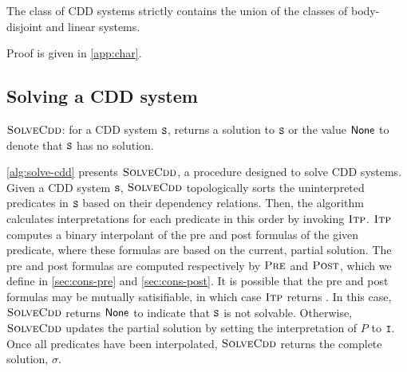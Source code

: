 \begin{thm}
\label{thm:cdd-contains}
  The class of CDD systems strictly contains the union of the classes
  of body-disjoint and linear systems.
\end{thm}
%
Proof is given in \autoref{app:char}.

\subsection{Solving a CDD system}
\label{sec:solve-cdd}

\begin{algorithm}[t]
  \caption{$\textsc{SolveCdd}$: for a CDD system $\cc{S}$, returns a
    solution to $\cc{S}$ or the value $\mathsf{None}$ to denote that
    $\cc{S}$ has no solution.}
  \label{alg:solve-cdd}
\end{algorithm}


\autoref{alg:solve-cdd} presents $\textsc{SolveCdd}$, a procedure designed to solve
CDD systems.
%
Given a CDD system $\cc{S}$, $\textsc{SolveCdd}$ topologically sorts the uninterpreted
predicates in $\cc{S}$ based on their dependency relations.
%
Then, the algorithm calculates interpretations for each predicate in this order
by invoking $\textsc{Itp}$.
%
$\textsc{Itp}$ computes a binary interpolant of the pre and post formulas of the
given predicate, where these formulas are based on the current, partial
solution.
%
The pre and post formulas are computed respectively by $\textsc{Pre}$ and
$\textsc{Post}$, which we define in \autoref{sec:cons-pre} and \autoref{sec:cons-post}.
%
It is possible that the pre and post formulas may be mutually satisifiable, in
which case $\textsc{Itp}$ returns . In this case, $\textsc{SolveCdd}$ returns
$\mathsf{None}$ to indicate that $\cc{S}$ is not solvable.
%
Otherwise, $\textsc{SolveCdd}$ updates the partial solution by setting the
interpretation of $P$ to $\cc{I}$.
%
Once all predicates have been interpolated, $\textsc{SolveCdd}$ returns the complete
solution, $\sigma$.

